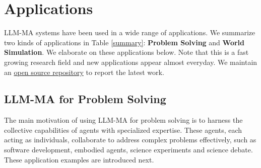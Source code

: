 \section{Applications} 
\label{Sec5:Application}


LLM-MA systems have been used in a wide range of applications. We summarize two kinds of applications in Table \ref{summary}: \textbf{Problem Solving} and  \textbf{World Simulation}. We   elaborate on these applications below. Note that this is a fast growing research field and new applications appear almost everyday. We maintain an  \href{https://github.com/taichengguo/LLM_MultiAgents_Survey_Papers}{open source repository} to report the latest work.  

\subsection{LLM-MA for Problem Solving}

The main motivation of using LLM-MA for problem solving is to harness the collective capabilities of agents with specialized expertise. These agents, each acting as individuals, collaborate to address complex problems effectively,  such as software development, embodied agents, science experiments and science debate. These application examples are introduced next.


